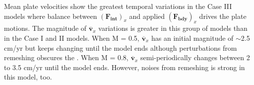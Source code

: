 \documentclass[letterpaper,12pt,notitle]{memphisthesis}                     %
\begin{document}
%

Mean plate velocities show the greatest temporal variations in the Case III models where balance between $(\boldsymbol{F_{int}})_x$ and applied $(\boldsymbol{F_{bdy}})_x$ drives the plate motions. The magnitude of $\overline{\boldsymbol{v}}_{x}$ variations is greater in this group of models than in the Case I and II models. When M = 0.5, $\overline{\boldsymbol{v}}_{x}$ has an initial magnitude of $\sim$2.5 cm/yr but keeps changing until the model ends although perturbations from remeshing obscures the . When M = 0.8, $\overline{\boldsymbol{v}}_{x}$ semi-periodically changes between 2 to 3.5 cm/yr until the model ends. However, noises from remeshing is strong in this model, too. 

\end{document}
